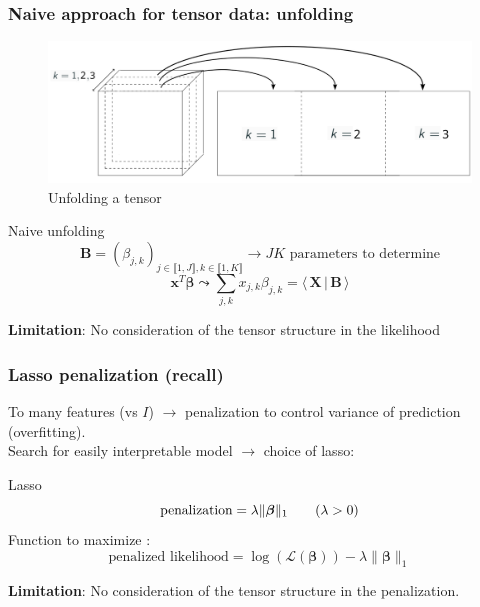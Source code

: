 \documentclass{beamer}
\begin{document}
\begin{frame}
    \frametitle{Naive approach for tensor data: unfolding}
    \begin{figure}
        \centering
        \includegraphics[scale = 0.15]{images/deplier.png}
        \caption{Unfolding a tensor}
    \end{figure}
    \begin{block}{Naive unfolding}
    $$\mathbf{B} = (\beta_{j,k})_{j \in \llbracket 1, J\rrbracket, k \in \llbracket 1, K\rrbracket} \rightarrow JK\text{ parameters to determine}$$ 
    $$\mathbf{x}^T \bm{\beta} \leadsto \sum\limits_{j,k} x_{j,k} \beta_{j,k} = \langle \, \mathbf{X} \, | \, \mathbf{B}\, \rangle$$
    \end{block}
    \textbf{Limitation}: No consideration of the tensor structure in the likelihood
    
    
\end{frame}

\begin{frame}
    \frametitle{Lasso penalization (recall)}
    To many features (vs $I$) $\rightarrow$ penalization to control variance of prediction (overfitting).\\[10 pt]
    Search for easily interpretable model $\rightarrow$ choice of lasso: 
    \begin{block}{Lasso}
    $$\text{penalization} = \lambda \lVert \bm{\beta} \rVert_1 \hspace{0.7 cm} (\lambda >0)$$
    Function to maximize : 
    $$ \text{penalized likelihood} =  \log(\mathcal{L}(\bm{\beta})) - \lambda \lVert \bm{\beta} \rVert_1 $$
    \end{block}
\vspace{5 pt}
    \textbf{Limitation}: No consideration of the tensor structure in the penalization.

    
\end{frame}
\end{document}
